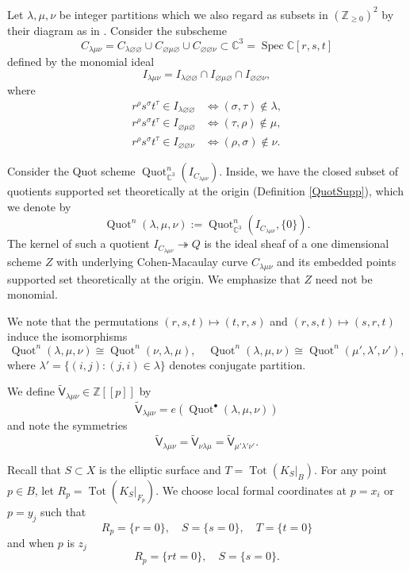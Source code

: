 \documentclass[12pt]{amsart}
\theoremstyle{definition}
\newcommand{\CC} {\mathbb{C}}          %
\newcommand{\ZZ} {\mathbb{Z}}		%
\renewcommand{\O}{\mathcal{O}}
\newcommand{\sfVtilde}{\widetilde{\mathsf{V}}}
\newcommand{\Quot}{\operatorname{Quot}}
\newcommand{\Tot}{\operatorname{Tot}}
\newcommand{\Spec}{\operatorname{Spec}}
\renewcommand{\emptyset}{\varnothing}
\begin{document}
Let $\lambda ,\mu ,\nu$ be integer partitions which we also regard as
subsets in $(\ZZ_{\geq 0})^{2}$ by their diagram as in
\cite{Bryan-Kool-Young}. Consider the subscheme
\[
C_{\lambda \mu \nu}=C_{\lambda \emptyset \emptyset}\cup
C_{\emptyset \mu \emptyset}\cup C_{\emptyset \emptyset \nu } \subset
\CC^{3}=\Spec \CC [r,s,t]
\]
defined by the monomial ideal
\[
I_{\lambda \mu \nu} = I_{\lambda \emptyset \emptyset}\cap I_{\emptyset \mu \emptyset}\cap I_{\emptyset \emptyset \nu},
\]
where 
\begin{align*}
r^{\rho}s^{\sigma}t^{\tau}\in I_{\lambda \emptyset \emptyset} & \iff
(\sigma ,\tau )\notin \lambda ,\\
r^{\rho}s^{\sigma}t^{\tau}\in I_{\emptyset \mu  \emptyset} & \iff
(\tau,\rho  )\notin \mu ,\\
r^{\rho}s^{\sigma}t^{\tau}\in I_{\emptyset \emptyset \nu } & \iff
(\rho ,\sigma  )\notin \nu . 
\end{align*}

Consider the Quot scheme $\Quot^{n}_{\CC^3}(I_{C_{\lambda \mu \nu}})$. Inside, we have the closed subset of quotients supported set theoretically at the origin (Definition \ref{QuotSupp}), which we denote by 
\begin{equation} \label{defHilblambdamunu}
\Quot^{n}(\lambda ,\mu ,\nu) := \Quot^{n}_{\CC^3}(I_{C_{\lambda \mu \nu}},\{0\}).
\end{equation}
The kernel of such a quotient $I_{C_{\lambda \mu \nu}} \twoheadrightarrow Q$ is the ideal sheaf of a one dimensional scheme $Z$ with underlying Cohen-Macaulay curve $C_{\lambda \mu \nu}$ and its embedded points supported set theoretically at the origin. We emphasize that $Z$ need not be monomial.

We note that the permutations
$(r,s,t)\mapsto (t,r,s)$ and $(r,s,t)\mapsto (s,r,t)$ induce the
isomorphisms
\[
\Quot^{n}(\lambda ,\mu ,\nu )\cong \Quot^{n}(\nu,\lambda,\mu   ),\quad
\Quot^{n}(\lambda ,\mu ,\nu )\cong \Quot^{n}( \mu ',\lambda ',\nu ' ),
\]
where $\lambda' = \{(i,j) : (j,i) \in \lambda\}$ denotes conjugate partition.

We define $\sfVtilde_{\lambda
\mu \nu}\in \ZZ [[p]]$ by
\[
\sfVtilde_{\lambda \mu \nu} = e\left(\Quot^{\bullet}(\lambda ,\mu ,\nu ) \right)
\]
and note the symmetries 
\[
\sfVtilde_{\lambda \mu \nu}=\sfVtilde_{ \nu \lambda \mu
}=\sfVtilde_{\mu '\lambda '\nu '}.
\]

Recall that $S\subset X$ is the elliptic surface and $T=\Tot
(K_{S}|_{B}).$ For any point $p\in B$, let $R_{p} =\Tot
(K_{S}|_{F_{p}})$. We choose local formal coordinates at $p = x_i$ or $p=y_j$ such that 
\[
R_{p} = \{r=0 \},\quad S=\{s=0 \}, \quad T=\{t=0 \}
\]
and when $p$ is $z_{j}$ 
\[
R_{p}=\{rt=0 \}, \quad S=\{s=0 \}.
\]
\end{document}
